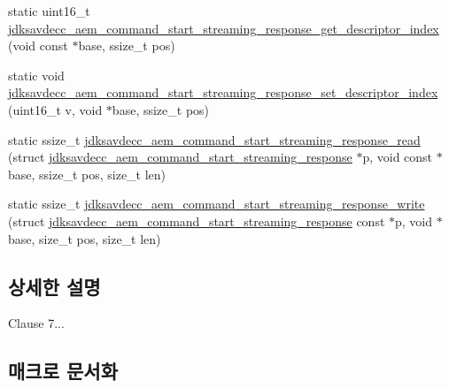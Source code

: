 \begin{DoxyCompactItemize}
\item 
static uint16\+\_\+t \hyperlink{group__command__start__streaming__response_ga5d4e2d26cf8b8a6301bf06db86c020c8}{jdksavdecc\+\_\+aem\+\_\+command\+\_\+start\+\_\+streaming\+\_\+response\+\_\+get\+\_\+descriptor\+\_\+index} (void const $\ast$base, ssize\+\_\+t pos)
\item 
static void \hyperlink{group__command__start__streaming__response_gaa7f21bdfe1f392437b081aedcda52f07}{jdksavdecc\+\_\+aem\+\_\+command\+\_\+start\+\_\+streaming\+\_\+response\+\_\+set\+\_\+descriptor\+\_\+index} (uint16\+\_\+t v, void $\ast$base, ssize\+\_\+t pos)
\item 
static ssize\+\_\+t \hyperlink{group__command__start__streaming__response_ga7aaa67f690314dc70f6972a98f5e23f7}{jdksavdecc\+\_\+aem\+\_\+command\+\_\+start\+\_\+streaming\+\_\+response\+\_\+read} (struct \hyperlink{structjdksavdecc__aem__command__start__streaming__response}{jdksavdecc\+\_\+aem\+\_\+command\+\_\+start\+\_\+streaming\+\_\+response} $\ast$p, void const $\ast$base, ssize\+\_\+t pos, size\+\_\+t len)
\item 
static ssize\+\_\+t \hyperlink{group__command__start__streaming__response_ga27e55e8be00e99bb7d015e0cd27890ff}{jdksavdecc\+\_\+aem\+\_\+command\+\_\+start\+\_\+streaming\+\_\+response\+\_\+write} (struct \hyperlink{structjdksavdecc__aem__command__start__streaming__response}{jdksavdecc\+\_\+aem\+\_\+command\+\_\+start\+\_\+streaming\+\_\+response} const $\ast$p, void $\ast$base, size\+\_\+t pos, size\+\_\+t len)
\end{DoxyCompactItemize}


\subsection{상세한 설명}
Clause 7... 

\subsection{매크로 문서화}
